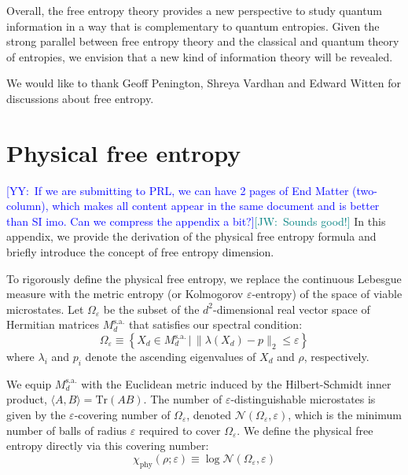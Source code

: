 \documentclass[aps,pre,twocolumn,superscriptaddress,amsmath,amssymb,reprint]{revtex4-2}
\def\eps{\varepsilon}
\newcommand*{\Tr}{\mathrm{Tr}}
\newcommand{\JW}[1]{\textcolor{teal}{[JW:\ #1]}}
\newcommand{\YY}[1]{\textcolor{blue}{[YY:\ #1]}}
\begin{document}
Overall, the free entropy theory provides a new perspective to study quantum information in a way that is complementary to quantum entropies. Given the strong parallel between free entropy theory and the classical and quantum theory of entropies, we envision that a new kind of information theory will be revealed.

\begin{acknowledgments}
We would like to thank Geoff Penington, Shreya Vardhan and Edward Witten for discussions about free entropy.
\end{acknowledgments}


\appendix

\section{Physical free entropy}\label{sec:regularize}
\YY{If we are submitting to PRL, we can have 2 pages of End Matter (two-column), which makes all content appear in the same document and is better than SI imo. Can we compress the appendix a bit?}\JW{Sounds good!}
In this appendix, we provide the derivation of the physical free entropy formula and briefly introduce the concept of free entropy dimension.

To rigorously define the physical free entropy, we replace the continuous Lebesgue measure with the metric entropy (or Kolmogorov $\eps$-entropy) of the space of viable microstates. Let $\Omega_\eps$ be the subset of the $d^2$-dimensional real vector space of Hermitian matrices $M_d^{\mathrm{s.a.}}$ that satisfies our spectral condition:
\begin{equation}
    \Omega_\eps \equiv \left\{ X_d \in M_d^{\mathrm{s.a.}} \, \big\vert \, \| \lambda(X_d) - p \|_2 \le \eps \right\}
\end{equation}
where $\lambda_i$ and $p_i$ denote the ascending eigenvalues of $X_d$ and $\rho$, respectively. 

We equip $M_d^{\mathrm{s.a.}}$ with the Euclidean metric induced by the Hilbert-Schmidt inner product, $\langle A, B \rangle = \Tr(A B)$. The number of $\eps$-distinguishable microstates is given by the $\eps$-covering number of $\Omega_\eps$, denoted $\mathcal{N}(\Omega_\eps, \eps)$, which is the minimum number of balls of radius $\eps$ required to cover $\Omega_\eps$. We define the physical free entropy directly via this covering number:
\begin{equation}
    \chi_{\mathrm{phy}}(\rho; \eps) \equiv \log \mathcal{N}(\Omega_\eps, \eps)
\end{equation}
\end{document}
